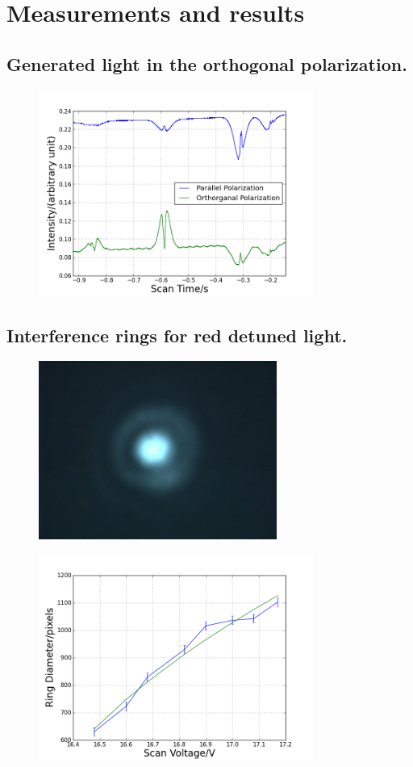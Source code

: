 \documentclass[aps,twocolumn,secnumarabic,balancelastpage,amsmath,amssymb,nofootinbib]{revtex4}
\begin{document}
\section{Measurements and results}
\subsection{Generated light in the orthogonal polarization.}
\begin{figure}
  \includegraphics[width=9cm]{../data/5-16_csv/intensities.png}
  \caption{}
  \label{intensities}
\end{figure}

\subsection{Interference rings for red detuned light.}
\begin{figure}
  \includegraphics[width=7.8cm]{rings.png}
  \caption{}
  \label{rings}
\end{figure}
\begin{figure}
  \includegraphics[width=9cm]{../data/5-16/ring-fit.png}
  \caption{}
  \label{ring_fit}
\end{figure}
\end{document}
